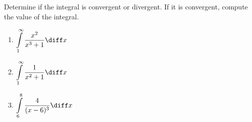 Determine if the integral is convergent or divergent. If it is convergent, compute the value of the integral.

\begin{enumerate}
\item $\displaystyle \int\limits_{1}^\infty \frac{x^2}{x^3+1}\diff x$
\item $\displaystyle \int \limits_{1}^{\infty} \frac{1 }{ x^2+1}\diff x$
\item  $\displaystyle\int\limits_{6}^8\frac{4}{(x-6)^3}\diff x$
\end{enumerate}